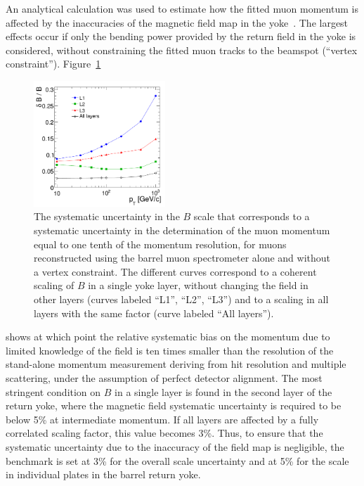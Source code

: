 An analytical calculation was used to estimate how the fitted muon
momentum is affected by the inaccuracies of the magnetic field
map in the yoke~\cite{ThesisBianchini}.
The largest effects occur if only the bending power provided by
the return field in the yoke is considered, without constraining the fitted
muon tracks to the beamspot (``vertex constraint'').
Figure~\ref{fig:accuracy}
\begin{figure}
  \begin{center}
    \includegraphics[width=0.44\textwidth]{fig/NoVertex}
    \caption{
      The systematic uncertainty in the $B$ scale that corresponds to a systematic
      uncertainty in the determination of the muon momentum equal to
      one tenth of the momentum resolution, for muons reconstructed using
      the barrel muon spectrometer alone and without a vertex
      constraint.
%
      The different curves correspond to a coherent scaling of $B$ in a
      single yoke layer, without changing the field in other layers
      (curves labeled ``L1'', ``L2'', ``L3'') and to a scaling
      in all layers with the same factor (curve labeled ``All layers'').
      }
    \label{fig:accuracy}
  \end{center}
\end{figure}
shows at which point the relative systematic bias on the momentum
due to limited knowledge of the field is ten times smaller than
the resolution of the stand-alone momentum measurement deriving from
hit resolution and multiple scattering, under the assumption of
perfect detector alignment.
The most stringent condition on $B$ in a single  layer is found
in the second layer of the return yoke, where the magnetic field
systematic uncertainty is required to be below 5\%
at intermediate momentum. If all layers are affected by a fully correlated
scaling factor, this value becomes 3\%.
Thus, to ensure that the systematic uncertainty due to the inaccuracy
of the field map is negligible, the benchmark is set at 3\% for the
overall scale uncertainty and at 5\% for the scale in
individual plates in the barrel return yoke.

